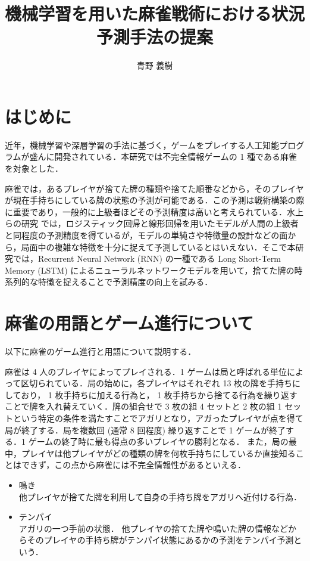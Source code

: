 \documentclass[a4paper,twoside,twocolumn,10pt]{article}
\title{機械学習を用いた麻雀戦術における状況予測手法の提案}
\author{青野 義樹}
\begin{document}
\maketitle %
\small

\section{はじめに}
近年，機械学習や深層学習の手法に基づく，ゲームをプレイする人工知能プログラムが盛んに開発されている．本研究では不完全情報ゲームの 1 種である麻雀を対象とした．

麻雀では，あるプレイヤが捨てた牌の種類や捨てた順番などから，そのプレイヤが現在手持ちにしている牌の状態の予測が可能である．この予測は戦術構築の際に重要であり，一般的に上級者ほどその予測精度は高いと考えられている．水上らの研究 \cite{pre_stu} では，ロジスティック回帰と線形回帰を用いたモデルが人間の上級者と同程度の予測精度を得ているが，モデルの単純さや特徴量の設計などの面から，局面中の複雑な特徴を十分に捉えて予測しているとはいえない．そこで本研究では，Recurrent Neural Network (RNN) の一種である Long Short-Term Memory (LSTM) によるニューラルネットワークモデルを用いて，捨てた牌の時系列的な特徴を捉えることで予測精度の向上を試みる．

\section{麻雀の用語とゲーム進行について}
以下に麻雀のゲーム進行と用語について説明する．

麻雀は 4 人のプレイヤによってプレイされる．1 ゲームは局と呼ばれる単位によって区切られている．局の始めに，各プレイヤはそれぞれ 13 枚の牌を手持ちにしており， 1 枚手持ちに加える行為と， 1 枚手持ちから捨てる行為を繰り返すことで牌を入れ替えていく．牌の組合せで 3 枚の組 4 セットと 2 枚の組 1 セットという特定の条件を満たすことでアガリとなり，アガったプレイヤが点を得て局が終了する．局を複数回 (通常 8 回程度) 繰り返すことで 1 ゲームが終了する．1 ゲームの終了時に最も得点の多いプレイヤの勝利となる．
また，局の最中，プレイヤは他プレイヤがどの種類の牌を何枚手持ちにしているか直接知ることはできず，この点から麻雀には不完全情報性があるといえる．
\begin{itemize}
\item 鳴き\\
他プレイヤが捨てた牌を利用して自身の手持ち牌をアガリへ近付ける行為．%

\item テンパイ\\
アガリの一つ手前の状態．%
他プレイヤの捨てた牌や鳴いた牌の情報などからそのプレイヤの手持ち牌がテンパイ状態にあるかの予測をテンパイ予測という．

\end{itemize}
\end{document}
